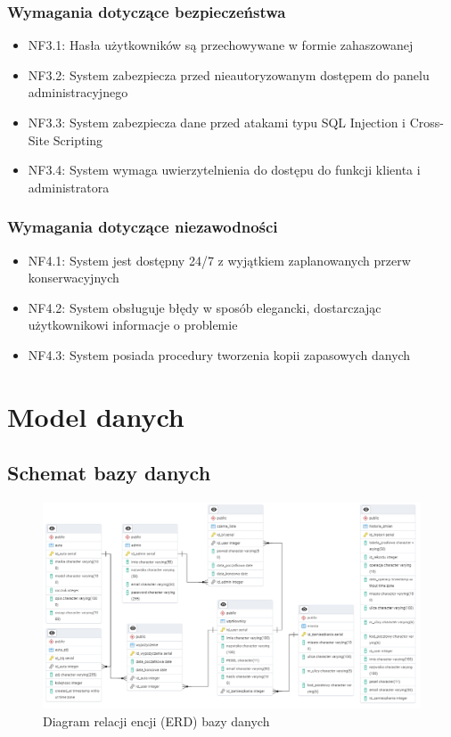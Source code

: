 \documentclass[12pt,a4paper]{article}
\begin{document}
\subsubsection{Wymagania dotyczące bezpieczeństwa}
\begin{itemize}
    \item NF3.1: Hasła użytkowników są przechowywane w formie zahaszowanej
    \item NF3.2: System zabezpiecza przed nieautoryzowanym dostępem do panelu administracyjnego
    \item NF3.3: System zabezpiecza dane przed atakami typu SQL Injection i Cross-Site Scripting
    \item NF3.4: System wymaga uwierzytelnienia do dostępu do funkcji klienta i administratora
\end{itemize}

\subsubsection{Wymagania dotyczące niezawodności}
\begin{itemize}
    \item NF4.1: System jest dostępny 24/7 z wyjątkiem zaplanowanych przerw konserwacyjnych
    \item NF4.2: System obsługuje błędy w sposób elegancki, dostarczając użytkownikowi informacje o problemie
    \item NF4.3: System posiada procedury tworzenia kopii zapasowych danych
\end{itemize}

\newpage
\section{Model danych}

\subsection{Schemat bazy danych}

\begin{figure}[H]
    \centering
    \includegraphics[width=1\textwidth]{erd.png}
    \caption{Diagram relacji encji (ERD) bazy danych}
    \label{fig:erd-diagram}
\end{figure}
\end{document}
